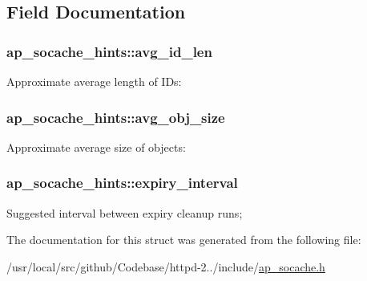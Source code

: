 \subsection{Field Documentation}
\subsubsection[{\texorpdfstring{avg\+\_\+id\+\_\+len}{avg_id_len}}]{ ap\+\_\+socache\+\_\+hints\+::avg\+\_\+id\+\_\+len}\hypertarget{structap__socache__hints_a0f488d4e96758190d2d12ce1b540cd34}{}\label{structap__socache__hints_a0f488d4e96758190d2d12ce1b540cd34}
Approximate average length of I\+Ds\+: 
\subsubsection[{\texorpdfstring{avg\+\_\+obj\+\_\+size}{avg_obj_size}}]{ ap\+\_\+socache\+\_\+hints\+::avg\+\_\+obj\+\_\+size}\hypertarget{structap__socache__hints_a1a590432f0b8147d98e50367c6c98aef}{}\label{structap__socache__hints_a1a590432f0b8147d98e50367c6c98aef}
Approximate average size of objects\+: 
\subsubsection[{\texorpdfstring{expiry\+\_\+interval}{expiry_interval}}]{ ap\+\_\+socache\+\_\+hints\+::expiry\+\_\+interval}\hypertarget{structap__socache__hints_afad2c05e98ed1dd238de5eddbc639f92}{}\label{structap__socache__hints_afad2c05e98ed1dd238de5eddbc639f92}
Suggested interval between expiry cleanup runs; 

The documentation for this struct was generated from the following file\+:\begin{DoxyCompactItemize}
\item 
/usr/local/src/github/\+Codebase/httpd-\/2../include/\hyperlink{ap__socache_8h}{ap\+\_\+socache.\+h}\end{DoxyCompactItemize}
